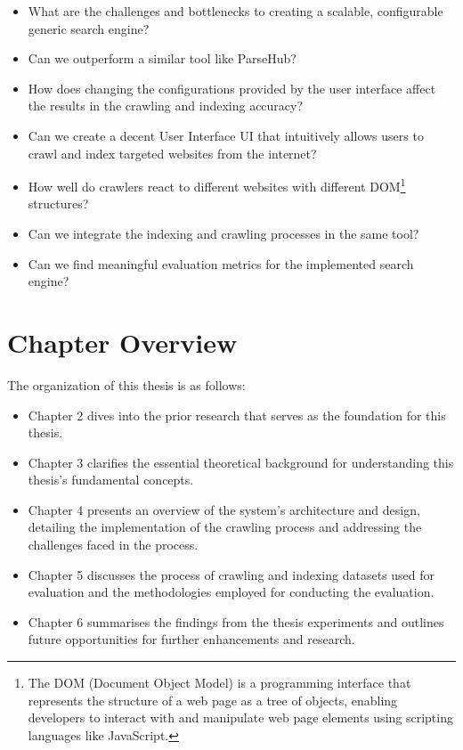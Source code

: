 \begin{itemize}
\setlength{\itemsep}{0pt} %
\setlength{\parskip}{0pt} %
\setlength{\parsep}{0pt} %
\setlength{\topsep}{0pt} %

  \item What are the challenges and bottlenecks to creating a scalable, configurable generic search engine?
\item Can we outperform a similar tool like ParseHub?
\item How does changing the configurations provided by the user interface affect the results in the crawling and indexing accuracy?
    \item Can we create a decent User Interface UI that intuitively allows users to crawl and index targeted websites from the internet?
\item How well do crawlers react to different websites with different DOM\footnote{The DOM (Document Object Model) is a programming interface that represents the structure of a web page as a tree of objects, enabling developers to interact with and manipulate web page elements using scripting languages like JavaScript.} structures?
    \item Can we integrate the indexing and crawling processes in the same tool?
    \item Can we find meaningful evaluation metrics for the implemented search engine?
\end{itemize}

\section{Chapter Overview}
The organization of this thesis is as follows:

\begin{itemize}
\setlength{\itemsep}{0pt} %
\setlength{\parskip}{0pt} %
\setlength{\parsep}{0pt} %
\setlength{\topsep}{0pt} %

  \item Chapter 2 dives into the prior research that serves as the foundation for this thesis.
  \item Chapter 3 clarifies the essential theoretical background for understanding this thesis's fundamental concepts.
  \item Chapter 4 presents an overview of the system's architecture and design, detailing the implementation of the crawling process and addressing the challenges faced in the process.
  \item Chapter 5 discusses the process of crawling and indexing datasets used for evaluation and the methodologies employed for conducting the evaluation.
  \item Chapter 6 summarises the findings from the thesis experiments and outlines future opportunities for further enhancements and research.
\end{itemize}